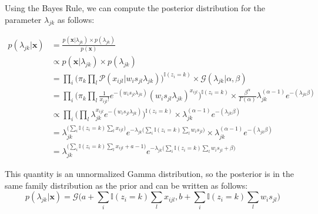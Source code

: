 Using the Bayes Rule, we can compute the posterior distribution for the parameter $\lambda_{jk}$ as follows:

\begin{equation} \label{posterior-poisson-bayes-rule-app}
  \begin{split}
  	p(\lambda_{jk} | \mathbf{x}) & = \frac{p(\mathbf{x}| \lambda_{jk}) \times p(\lambda_{jk})}{p(\mathbf{x})} \\
  		& \propto p(\mathbf{x}| \lambda_{jk}) \times p(\lambda_{jk}) \\
  		& = \prod_{i} \bigg(\pi_{k} \prod_{l} \mathcal{P}(x_{ijl} | w_{i}s_{jl} \lambda_{jk})\bigg)^{\mathbb{I}(z_{i}=k)} \times \mathcal{G}(\lambda_{jk}|\alpha, \beta) \\
  		& = \prod_{i} \bigg(\pi_{k} \prod_{l} \frac{1}{x_{ijl}!} e^{-(w_{i}s_{jl}\lambda_{jk})} (w_{i}s_{jl}\lambda_{jk})^{x_{ijl}}\bigg)^{\mathbb{I}(z_{i}=k)} \times \frac{\beta^{\alpha}}{\Gamma(\alpha)}\lambda_{jk}^{(\alpha-1)} e^{-(\lambda_{jk}\beta)} \\
  		& \propto \prod_{i} \bigg( \prod_{l} \lambda_{jk}^{x_{ijl}} e^{-(w_{i}s_{jl}\lambda_{jk})}\bigg)^{\mathbb{I}(z_{i}=k)} \times \lambda_{jk}^{(\alpha-1)} e^{-(\lambda_{jk}\beta)} \\
  		& = \lambda_{jk}^{\big(\sum\limits_{i} \mathbb{I}(z_{i}=k) \sum\limits_{l} x_{ijl}\big)} e^{-\lambda_{jk}\big(\sum\limits_{i} \mathbb{I}(z_{i}=k) \sum\limits_{l} w_{i}s_{jl}\big)} \times \lambda_{jk}^{(\alpha-1)} e^{-(\lambda_{jk}\beta)} \\
		& = \lambda_{jk}^{\big(\sum\limits_{i} \mathbb{I}(z_{i}=k) \sum\limits_{l} x_{ijl} + a -1\big)} e^{-\lambda_{jk}\big(\sum\limits_{i} \mathbb{I}(z_{i}=k) \sum\limits_{l} w_{i}s_{jl} + \beta \big)}
  \end{split}
\end{equation}

This quantity is an unnormalized Gamma distribution, so the posterior is in the same family distribution as the prior and can be written as follows:
\begin{equation} \label{posterior-poisson-final-app}
  	p(\lambda_{jk} | \mathbf{x}) = \mathcal{G}\bigg(a + \sum\limits_{i} \mathbb{I}(z_{i}=k) \sum\limits_{l} x_{ijl}, b + \sum\limits_{i} \mathbb{I}(z_{i}=k) \sum\limits_{l} w_{i}s_{jl} \bigg)
\end{equation}
 

